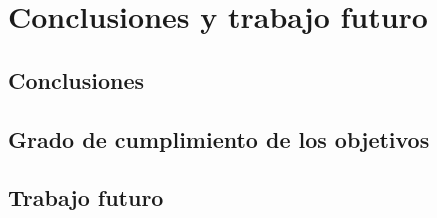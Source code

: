 \chapter{Conclusiones y trabajo futuro}
\label{ch:conclusiones}


\section{Conclusiones}
\label{sec:conclusiones}

\section{Grado de cumplimiento de los objetivos}
\label{sec:cumplimiento}

\section{Trabajo futuro}
\label{sec:trabajo_futuro}
